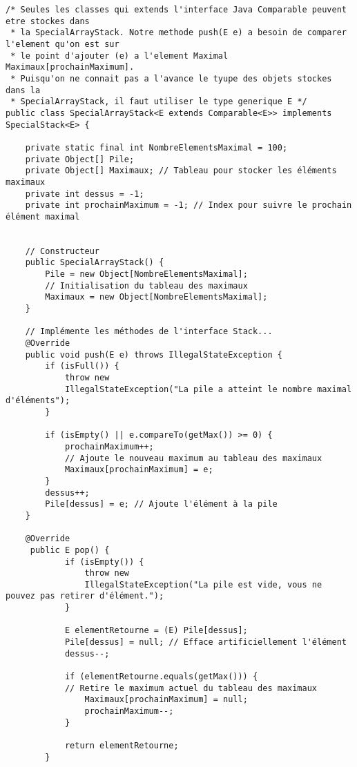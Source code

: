 \documentclass[10pt]{report}
\begin{document}
    \begin{lstlisting}[style=JavaDraculaWhite]
 /* Seules les classes qui extends l'interface Java Comparable peuvent etre stockes dans 
 * la SpecialArrayStack. Notre methode push(E e) a besoin de comparer l'element qu'on est sur 
 * le point d'ajouter (e) a l'element Maximal  Maximaux[prochainMaximum]. 
 * Puisqu'on ne connait pas a l'avance le tyupe des objets stockes dans la 
 * SpecialArrayStack, il faut utiliser le type generique E */
public class SpecialArrayStack<E extends Comparable<E>> implements SpecialStack<E> {   

    private static final int NombreElementsMaximal = 100;
    private Object[] Pile;
    private Object[] Maximaux; // Tableau pour stocker les éléments maximaux
    private int dessus = -1;
    private int prochainMaximum = -1; // Index pour suivre le prochain élément maximal


    // Constructeur
    public SpecialArrayStack() {
        Pile = new Object[NombreElementsMaximal];
        // Initialisation du tableau des maximaux
        Maximaux = new Object[NombreElementsMaximal]; 
    }

    // Implémente les méthodes de l'interface Stack...
    @Override
    public void push(E e) throws IllegalStateException {
        if (isFull()) {
            throw new 
            IllegalStateException("La pile a atteint le nombre maximal d'éléments");
        }
        
        if (isEmpty() || e.compareTo(getMax()) >= 0) {
            prochainMaximum++; 
            // Ajoute le nouveau maximum au tableau des maximaux
            Maximaux[prochainMaximum] = e;
        }
        dessus++;
        Pile[dessus] = e; // Ajoute l'élément à la pile
    }

    @Override
     public E pop() {
            if (isEmpty()) {
                throw new 
                IllegalStateException("La pile est vide, vous ne pouvez pas retirer d'élément.");
            }
            
            E elementRetourne = (E) Pile[dessus];
            Pile[dessus] = null; // Efface artificiellement l'élément
            dessus--;
            
            if (elementRetourne.equals(getMax())) {
            // Retire le maximum actuel du tableau des maximaux
                Maximaux[prochainMaximum] = null; 
                prochainMaximum--;
            }
            
            return elementRetourne;
        }


\end{lstlisting}
\end{document}
